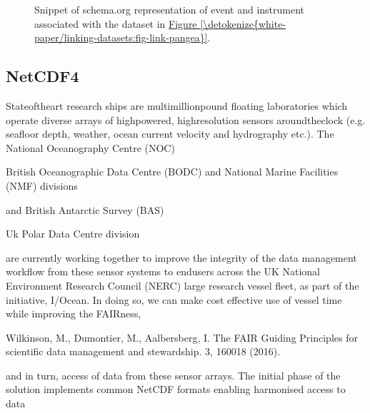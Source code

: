 \documentclass[a4paper,10pt,english]{sphinxmanual}
\begin{document}
\begin{figure}[htbp]
\centering
\capstart

\noindent{}
\caption{Snippet of schema.org representation of event and instrument
associated with the dataset in \hyperref[\detokenize{white-paper/linking-datasets:fig-link-pangea}]{Figure \ref{\detokenize{white-paper/linking-datasets:fig-link-pangea}}}.}\label{\detokenize{white-paper/linking-datasets:fig-link-schema-org}}\end{figure}


\subsection{NetCDF4}
\label{\detokenize{white-paper/linking-datasets:netcdf4}}\label{\detokenize{white-paper/linking-datasets:section-1}}
\sphinxAtStartPar
State\sphinxhyphen{}of\sphinxhyphen{}the\sphinxhyphen{}art research ships are multimillion\sphinxhyphen{}pound floating
laboratories which operate diverse arrays of high\sphinxhyphen{}powered,
high\sphinxhyphen{}resolution sensors around\sphinxhyphen{}the\sphinxhyphen{}clock (e.g. sea\sphinxhyphen{}floor depth,
weather, ocean current velocity and hydrography etc.). The National
Oceanography Centre (NOC)%
\begin{footnote}[1]\sphinxAtStartFootnote
British Oceanographic Data Centre (BODC) and National Marine
Facilities (NMF) divisions
%
\end{footnote} and British Antarctic Survey
(BAS)%
\begin{footnote}[2]\sphinxAtStartFootnote
Uk Polar Data Centre division
%
\end{footnote} are currently working together to improve the
integrity of the data management workflow from these sensor systems to
end\sphinxhyphen{}users across the UK National Environment Research Council (NERC)
large research vessel fleet, as part of the initiative, I/Ocean. In
doing so, we can make cost effective use of vessel time while
improving the FAIRness,%
\begin{footnote}[3]\sphinxAtStartFootnote
Wilkinson, M., Dumontier, M., Aalbersberg, I.  The FAIR
Guiding Principles for scientific data management and stewardship.
 3, 160018 (2016). 
%
\end{footnote} and in turn, access of data
from these sensor arrays. The initial phase of the solution
implements common NetCDF formats enabling harmonised access to data
\end{document}
